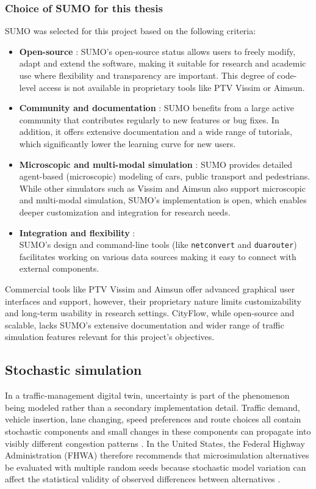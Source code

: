 \subsubsection{Choice of SUMO for this thesis}
SUMO was selected for this project based on the following criteria:
\begin{itemize}
    \item \textbf{Open-source} : SUMO’s open-source status allows users to freely modify, adapt and extend the software, making it suitable for research and academic use where flexibility and transparency are important. This degree of code-level access is not available in proprietary tools like PTV Vissim or Aimsun.
    \item \textbf{Community and documentation} : SUMO benefits from a large active community that contributes regularly to new features or bug fixes. In addition, it offers extensive documentation and a wide range of tutorials, which significantly lower the learning curve for new users.
    \item \textbf{Microscopic and multi-modal simulation} : SUMO provides detailed agent-based (microscopic) modeling of cars, public transport and pedestrians. While other simulators such as Vissim and Aimsun also support microscopic and multi-modal simulation, SUMO’s implementation is open, which enables deeper customization and integration for research needs.
    \item \textbf{Integration and flexibility} :\\ SUMO's design and command-line tools (like \texttt{netconvert} and \texttt{duarouter}) facilitates working on various data sources making it easy to connect with external components.
\end{itemize}

Commercial tools like PTV Vissim and Aimsun offer advanced graphical user interfaces and support, however, their proprietary nature limits customizability and long-term usability in research settings. CityFlow, while open-source and scalable, lacks SUMO’s extensive documentation and wider range of traffic simulation features relevant for this project’s objectives.

\subsection{Stochastic simulation}

In a traffic-management digital twin, uncertainty is part of the phenomenon being modeled rather
than a secondary implementation detail. Traffic demand, vehicle insertion, lane changing, speed
preferences and route choices all contain stochastic components and small changes in these
components can propagate into visibly different congestion patterns
\cite{digital_twin_transport,flow_twin,sumo_randomness,fhwa_microsim_2019}. In the United States, the Federal Highway Administration (FHWA) therefore recommends that
microsimulation alternatives be evaluated with multiple random seeds because stochastic model
variation can affect the statistical validity of observed differences between alternatives
\cite{fhwa_microsim_2019}.

